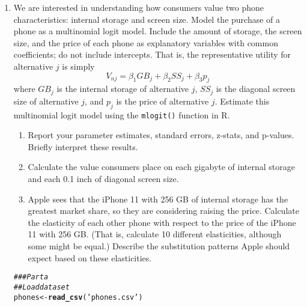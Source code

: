\documentclass[11pt,letterpaper]{article}\usepackage[]{graphicx}\usepackage[]{color}
\makeatletter
\newcommand{\hlstr}[1]{\textcolor[rgb]{0.192,0.494,0.8}{#1}}%
\newcommand{\hlcom}[1]{\textcolor[rgb]{0.678,0.584,0.686}{\textit{#1}}}%
\newcommand{\hlstd}[1]{\textcolor[rgb]{0.345,0.345,0.345}{#1}}%
\newcommand{\hlkwb}[1]{\textcolor[rgb]{0.69,0.353,0.396}{#1}}%
\newcommand{\hlkwd}[1]{\textcolor[rgb]{0.737,0.353,0.396}{\textbf{#1}}}%
\newenvironment{kframe}{%
 \def\at@end@of@kframe{}%
 \ifinner\ifhmode%
  \def\at@end@of@kframe{\end{minipage}}%
  \begin{minipage}{\columnwidth}%
 \fi\fi%
 \def\FrameCommand##1{\hskip\@totalleftmargin \hskip-\fboxsep
 \colorbox{shadecolor}{##1}\hskip-\fboxsep
     \hskip-\linewidth \hskip-\@totalleftmargin \hskip\columnwidth}%
 \MakeFramed {\advance\hsize-\width
   \@totalleftmargin\z@ \linewidth\hsize
   \@setminipage}}%
 {\par\unskip\endMakeFramed%
 \at@end@of@kframe}
\newenvironment{knitrout}{}{} %
\makeatother
\begin{document}
\begin{enumerate}[label=\alph*., leftmargin=*]
	\item We are interested in understanding how consumers value two phone characteristics: internal storage and screen size. Model the purchase of a phone as a multinomial logit model. Include the amount of storage, the screen size, and the price of each phone as explanatory variables with common coefficients; do not include intercepts. That is, the representative utility for alternative $j$ is simply
	$$V_{nj} = \beta_1 GB_j + \beta_2 SS_j + \beta_3 p_j$$
	where $GB_j$ is the internal storage of alternative $j$, $SS_j$ is the diagonal screen size of alternative $j$, and $p_j$ is the price of alternative $j$. Estimate this multinomial logit model using the \texttt{mlogit()} function in R. 
	\begin{enumerate}[label=\roman*.]
		\item Report your parameter estimates, standard errors, z-stats, and p-values. Briefly interpret these results. 
		\item Calculate the value consumers place on each gigabyte of internal storage and each 0.1 inch of diagonal screen size.
		\item Apple sees that the iPhone 11 with 256 GB of internal storage has the greatest market share, so they are considering raising the price. Calculate the elasticity of each other phone with respect to the price of the iPhone 11 with 256 GB. (That is, calculate 10 different elasticities, although some might be equal.) Describe the substitution patterns Apple should expect based on these elasticities.
	\end{enumerate}

\begin{knitrout}
\color{fgcolor}\begin{kframe}
\begin{alltt}
\hlcom{### Part a}
\hlcom{## Load dataset}
\hlstd{phones} \hlkwb{<-} \hlkwd{read_csv}\hlstd{(}\hlstr{'phones.csv'}\hlstd{)}
\end{alltt}



\end{kframe}
\end{knitrout}
\end{enumerate}
\end{document}
